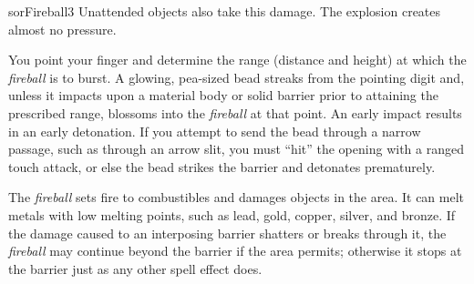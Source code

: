 \begin{spellcard}{sor}{Fireball}{3}
  Unattended objects also take this damage. The explosion creates almost
  no pressure.

  You point your finger and determine the range (distance and height) at
  which the \emph{fireball} is to burst. A glowing, pea-sized bead streaks
  from the pointing digit and, unless it impacts upon a material body or
  solid barrier prior to attaining the prescribed range, blossoms into the
  \emph{fireball} at that point. An early impact results in an early
  detonation. If you attempt to send the bead through a narrow passage,
  such as through an arrow slit, you must ``hit'' the opening with a ranged
  touch attack, or else the bead strikes the barrier and detonates
  prematurely.

  The \emph{fireball} sets fire to combustibles and damages objects in the
  area. It can melt metals with low melting points, such as lead, gold,
  copper, silver, and bronze. If the damage caused to an interposing
  barrier shatters or breaks through it, the \emph{fireball} may continue
  beyond the barrier if the area permits; otherwise it stops at the
  barrier just as any other spell effect does.

\end{spellcard}
